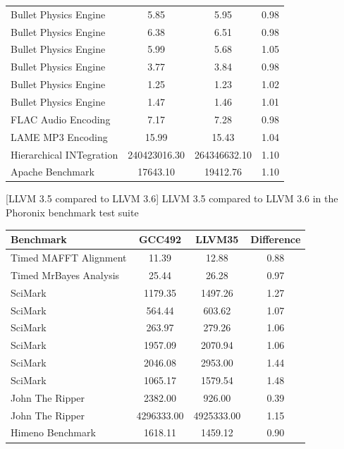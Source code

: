 \begin{appendix}
\begin{table}[htbp]
\begin{longtable}{l|c|c|c}
        Bullet Physics Engine & 5.85 & 5.95 & 0.98 \\
        Bullet Physics Engine & 6.38 & 6.51 & 0.98 \\
        Bullet Physics Engine & 5.99 & 5.68 & 1.05 \\
        Bullet Physics Engine & 3.77 & 3.84 & 0.98 \\
        Bullet Physics Engine & 1.25 & 1.23 & 1.02 \\
        Bullet Physics Engine & 1.47 & 1.46 & 1.01 \\
        FLAC Audio Encoding & 7.17 & 7.28 & 0.98 \\
        LAME MP3 Encoding & 15.99 & 15.43 & 1.04 \\
        Hierarchical INTegration & 240423016.30 & 264346632.10 & 1.10 \\
        Apache Benchmark & 17643.10 & 19412.76 & 1.10 \\
        \hline
    \end{longtable}
    [\ac{LLVM} 3.5 compared to \ac{LLVM} 3.6]{
        \ac{LLVM} 3.5 compared to \ac{LLVM} 3.6 in the Phoronix benchmark test suite\cite{LLVM35vsLLVM36}
        }
    \label{table:llvm35vsllvm36}
\end{table}
\begin{table}[htbp]
    \centering
    \begin{longtable}{l|c|c|c}
        \hline
        Benchmark & GCC492 & LLVM35 & Difference \\
        \hline
        Timed MAFFT Alignment & 11.39 & 12.88 & 0.88 \\
        Timed MrBayes Analysis & 25.44 & 26.28 & 0.97 \\
        SciMark & 1179.35 & 1497.26 & 1.27 \\
        SciMark & 564.44 & 603.62 & 1.07 \\
        SciMark & 263.97 & 279.26 & 1.06 \\
        SciMark & 1957.09 & 2070.94 & 1.06 \\
        SciMark & 2046.08 & 2953.00 & 1.44 \\
        SciMark & 1065.17 & 1579.54 & 1.48 \\
        John The Ripper & 2382.00 & 926.00 & 0.39 \\
        John The Ripper & 4296333.00 & 4925333.00 & 1.15 \\
        Himeno Benchmark & 1618.11 & 1459.12 & 0.90 \\

\end{longtable}
\end{table}
\end{appendix}
